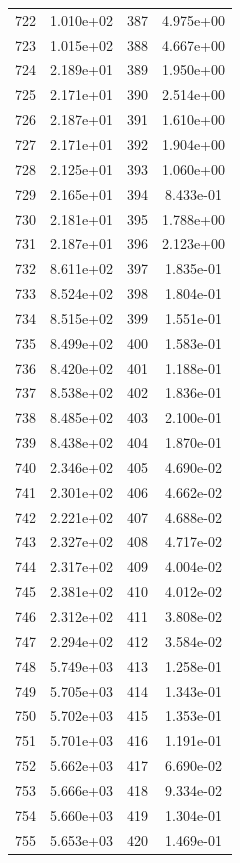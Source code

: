 \documentclass[12pt]{article}
\begin{document}
\begin{longtable}{@{}cccc@{}}
722 & 1.010e+02 & 387 & 4.975e+00 \\
723 & 1.015e+02 & 388 & 4.667e+00 \\
724 & 2.189e+01 & 389 & 1.950e+00 \\
725 & 2.171e+01 & 390 & 2.514e+00 \\
726 & 2.187e+01 & 391 & 1.610e+00 \\
727 & 2.171e+01 & 392 & 1.904e+00 \\
728 & 2.125e+01 & 393 & 1.060e+00 \\
729 & 2.165e+01 & 394 & 8.433e-01 \\
730 & 2.181e+01 & 395 & 1.788e+00 \\
731 & 2.187e+01 & 396 & 2.123e+00 \\
732 & 8.611e+02 & 397 & 1.835e-01 \\
733 & 8.524e+02 & 398 & 1.804e-01 \\
734 & 8.515e+02 & 399 & 1.551e-01 \\
735 & 8.499e+02 & 400 & 1.583e-01 \\
736 & 8.420e+02 & 401 & 1.188e-01 \\
737 & 8.538e+02 & 402 & 1.836e-01 \\
738 & 8.485e+02 & 403 & 2.100e-01 \\
739 & 8.438e+02 & 404 & 1.870e-01 \\
740 & 2.346e+02 & 405 & 4.690e-02 \\
741 & 2.301e+02 & 406 & 4.662e-02 \\
742 & 2.221e+02 & 407 & 4.688e-02 \\
743 & 2.327e+02 & 408 & 4.717e-02 \\
744 & 2.317e+02 & 409 & 4.004e-02 \\
745 & 2.381e+02 & 410 & 4.012e-02 \\
746 & 2.312e+02 & 411 & 3.808e-02 \\
747 & 2.294e+02 & 412 & 3.584e-02 \\
748 & 5.749e+03 & 413 & 1.258e-01 \\
749 & 5.705e+03 & 414 & 1.343e-01 \\
750 & 5.702e+03 & 415 & 1.353e-01 \\
751 & 5.701e+03 & 416 & 1.191e-01 \\
752 & 5.662e+03 & 417 & 6.690e-02 \\
753 & 5.666e+03 & 418 & 9.334e-02 \\
754 & 5.660e+03 & 419 & 1.304e-01 \\
755 & 5.653e+03 & 420 & 1.469e-01 \\

\end{longtable}
\end{document}
